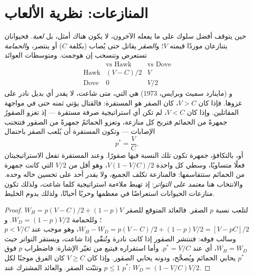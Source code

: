 \section{المنازعات: نظرية الألعاب}

\begin{proposition}\label{prop:b3:behavioural-ecology:hawk-dove}
حين يتوقف أفضل سلوك على ما يفعله الآخرون، لا يكون هناك أمثل،
بل \emph{لعبة}. فحيوانان يتنازعان موردًا قيمته $V$؛
و\emph{الصقر} يقاتل حتى يُصاب (بكلفة $C$) أو ينتصر،
و\emph{الحمامة} تستعرض وتنسحب إن هوجمت. ومتوسطات العوائد
\[
\begin{array}{c|cc}
 & \text{vs Hawk} & \text{vs Dove}\\ \hline
\text{Hawk} & (V - C)/2 & V\\
\text{Dove} & 0 & V/2
\end{array}
\]
و\emph{} (ماينارد سميث وبرايس، 1973)
هي التي، متى شاعت، لا يقدر أي بديل نادر على غزوها.
فإذا كان $V > C$، كان الصقر هو المستقرة: فالقتال يؤتي ثمنه
حتى في مواجهة المقاتلين. وإذا كان $V
< C$، لم تكن أي استراتيجية صرفة مستقرة --- إذ تغزو الصقورُ
جمهرةً من الحمائم فتربح كل منازعة، وتغزو الحمائمُ جمهرةً من
الصقور فتتجنب الإصابات --- وتكون المستقرة أن يُلعب الصقر
باحتمال
\[
p^{*} = \frac{V}{C},
\]
أو، بالتكافؤ، جمهرة تكون تلك النسبة فيها صقورًا. وعند
المستقرة تفعل الاستراتيجيتان فعلًا متساويًا، وسطي كل واحدة
$V(1 -
V/C)/2$، وهو أقل من $V/2$ التي كانت جمهرة من الحمائم
ستتقاسمها: فالمنازعة تكلف الجميع، ولا يقدر أحد على تحسين
حاله وحده. والانتخاب هنا \emph{معتمد على التواتر}: إذ تهبط
ملاءمة استراتيجية كلما شاعت، ولذلك تكون منازعات الحيوانات
استعراضًا في معظمها وحربًا أحيانًا، ولذلك يدوم الخليط.
\end{proposition}
\begin{proof}
لتلعب نسبة $p$ الصقر. فالعائد المتوقع للصقر $W_{H} = p(V
- C)/2 + (1 - p)V$؛ وللحمامة $W_{D} = (1 - p)V/2$. و$W_{H} - W_{D} =
p(V - C)/2 + (1 - p)V/2 = [V - pC]/2$، وهو موجب عند $p < V/C$
وسالب فوقه: فتنتشر الصقور إذا كانت نادرة وتُنقّى إذا شاعت،
ويستقر التواتر حيث $W_{H} = W_{D}$، أي عند $p^{*} = V/C$. وأما
استقراره فيتبع من تغيّر الإشارة: فاضطراب $p$ فوق
$p^{*}$ يحابي الحمائم ويُصحَّح، ودونه يحابي الصقور. وإذا كان $V
\ge C$ كان الفرق موجبًا لكل $p \le 1$ وتثبّت الصقر.
والعائد المشترك عند $p^{*}$: $W_{D} = (1 - V/C)V/2$.
\end{proof}

